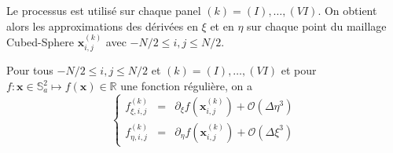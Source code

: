Le processus est utilisé sur chaque panel $(k) = (I), \ldots , (VI)$. On obtient alors les approximations des dérivées en $\xi$ et en $\eta$ sur chaque point du maillage Cubed-Sphere $\mathbf{x}_{i,j}^{(k)}$ avec $-N/2 \leq i,j \leq N/2$.

\begin{theoreme}
Pour tous $-N/2 \leq i,j \leq N/2$ et $(k) = (I) , \ldots , (VI)$ et pour $f : \mathbf{x} \in \mathbb{S}_a^2 \mapsto f(\mathbf{x}) \in \mathbb{R}$ une fonction régulière, on a 
\begin{equation}
\left\lbrace
\begin{array}{rcl}
f_{\xi,i,j}^{(k)} & = & \partial_{\xi} f(\mathbf{x}_{i,j}^{(k)}) + \mathcal{O}(\Delta \eta^3) \\
f_{\eta,i,j}^{(k)} & = & \partial_{\eta} f(\mathbf{x}_{i,j}^{(k)}) + \mathcal{O}(\Delta \xi^3)
\end{array}
\right.
\end{equation}
\label{th:consistance_der_xieta}
\end{theoreme}

